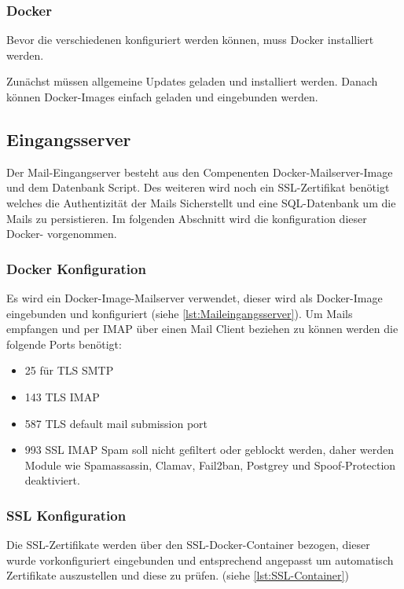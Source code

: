 \documentclass[a4paper,11pt,singlespacing]{article}
\begin{document}
		\subsubsection{Docker}\label{sec:DockerAufsetzen}
			Bevor die verschiedenen  konfiguriert werden können, muss Docker installiert werden.
			
			Zunächst müssen allgemeine Updates geladen und installiert werden. Danach können Docker-Images einfach geladen und eingebunden werden.
	
	\subsection{Eingangsserver}\label{sec:UmsetzungEingangsserver}
		Der Mail-Eingangserver besteht aus den Compenenten Docker-Mailserver-Image und dem Datenbank Script.
		Des weiteren wird noch ein SSL-Zertifikat benötigt welches die Authentizität der Mails Sicherstellt und eine SQL-Datenbank um die Mails zu persistieren.
		Im folgenden Abschnitt wird die konfiguration dieser Docker- vorgenommen.

		\subsubsection{Docker Konfiguration}\label{Mail-In-Container}
			Es wird ein Docker-Image-Mailserver verwendet, dieser wird als Docker-Image eingebunden und konfiguriert (siehe \autoref{lst:Maileingangsserver}). Um Mails empfangen und per IMAP über einen Mail Client beziehen zu können werden die folgende Ports benötigt:
		\begin{itemize}
			\item
				25 für TLS SMTP
			\item
				143 TLS IMAP
			\item
				587 TLS default mail submission port
			\item
				993 SSL IMAP
			Spam soll nicht gefiltert oder geblockt werden, daher werden Module wie Spamassassin, Clamav, Fail2ban, Postgrey und Spoof-Protection deaktiviert.
		\end{itemize}
			
		\subsubsection{SSL Konfiguration}\label{SSl-Container}
			Die SSL-Zertifikate werden über den SSL-Docker-Container bezogen, dieser wurde vorkonfiguriert eingebunden und entsprechend angepasst um automatisch Zertifikate auszustellen und diese zu prüfen. (siehe \autoref{lst:SSL-Container})
\end{document}

